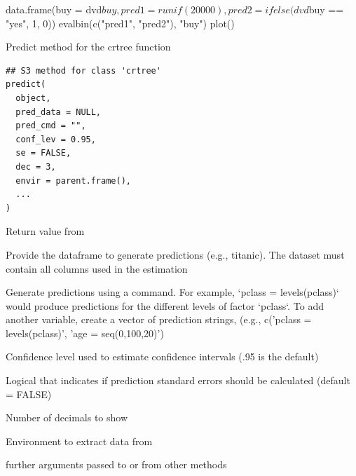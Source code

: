 \documentclass[a4paper]{book}
\begin{document}
%
\begin{Examples}
\begin{ExampleCode}
data.frame(buy = dvd$buy, pred1 = runif(20000), pred2 = ifelse(dvd$buy == "yes", 1, 0)) %
  evalbin(c("pred1", "pred2"), "buy") %
  plot()
\end{ExampleCode}
\end{Examples}
%
\begin{Description}
Predict method for the crtree function
\end{Description}
%
\begin{Usage}
\begin{verbatim}
## S3 method for class 'crtree'
predict(
  object,
  pred_data = NULL,
  pred_cmd = "",
  conf_lev = 0.95,
  se = FALSE,
  dec = 3,
  envir = parent.frame(),
  ...
)
\end{verbatim}
\end{Usage}
%
\begin{Arguments}
\begin{ldescription}
\item[\code{object}] Return value from 

\item[\code{pred\_data}] Provide the dataframe to generate predictions (e.g., titanic). The dataset must contain all columns used in the estimation

\item[\code{pred\_cmd}] Generate predictions using a command. For example, `pclass = levels(pclass)` would produce predictions for the different levels of factor `pclass`. To add another variable, create a vector of prediction strings, (e.g., c('pclass = levels(pclass)', 'age = seq(0,100,20)')

\item[\code{conf\_lev}] Confidence level used to estimate confidence intervals (.95 is the default)

\item[\code{se}] Logical that indicates if prediction standard errors should be calculated (default = FALSE)

\item[\code{dec}] Number of decimals to show

\item[\code{envir}] Environment to extract data from

\item[\code{...}] further arguments passed to or from other methods
\end{ldescription}
\end{Arguments}
\end{document}
